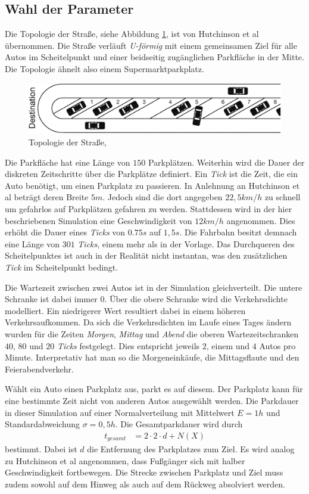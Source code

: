 \subsection{Wahl der Parameter}
Die Topologie der Straße, siehe Abbildung \ref{fig_street}, ist von Hutchinson et al übernommen. Die Straße verläuft \emph{U-förmig} mit einem gemeinsamen Ziel für alle Autos im Scheitelpunkt und einer beidseitig zugänglichen Parkfläche in der Mitte. Die Topologie ähnelt also einem Supermarktparkplatz. 
\begin{figure}
\includegraphics[width=\textwidth]{pics/street.png}
\caption{Topologie der Straße, \cite[Fig. 18-1]{hutchinson}}\label{fig_street}
\end{figure}
 Die Parkfläche hat eine Länge von $150$ Parkplätzen. Weiterhin wird die Dauer der diskreten Zeitschritte über die Parkplätze definiert. Ein \emph{Tick} ist die Zeit, die ein Auto benötigt, um einen Parkplatz zu passieren. 
In Anlehnung an Hutchinson et al \cite[Modeling the Interactions of Parking Strategies, S. 4f]{hutchinson} beträgt deren Breite $5m$. Jedoch sind die dort angegeben $22,5 km/h$ zu schnell um gefahrlos auf Parkplätzen gefahren zu werden. Stattdessen wird in der hier beschriebenen Simulation eine Geschwindigkeit von $12km/h$ angenommen. Dies erhöht die Dauer eines \emph{Ticks} von $0.75s$ auf $1,5s$. Die Fahrbahn besitzt demnach eine Länge von $301$ \emph{Ticks}, einem mehr als in der Vorlage. Das Durchqueren des Scheitelpunktes ist auch in der Realität nicht instantan, was den zusätzlichen \emph{Tick} im Scheitelpunkt bedingt. 

Die Wartezeit zwischen zwei Autos ist in der Simulation gleichverteilt. Die untere Schranke ist dabei immer $0$. Über die obere Schranke wird die Verkehrsdichte modelliert. Ein niedrigerer Wert resultiert dabei in einem höheren Verkehrsaufkommen. Da sich die Verkehrsdichten im Laufe eines Tages ändern wurden für die Zeiten \emph{Morgen}, \emph{Mittag} und \emph{Abend} die oberen Wartezeitschranken $40$, $80$ und $20$ \emph{Ticks} festgelegt. Dies entspricht jeweils $2$, einem und $4$ Autos pro Minute. Interpretativ hat man so die Morgeneinkäufe, die Mittagsflaute und den Feierabendverkehr. 

Wählt ein Auto einen Parkplatz aus, parkt es auf diesem. Der Parkplatz kann für eine bestimmte Zeit nicht von anderen Autos ausgewählt werden. Die Parkdauer in dieser Simulation auf einer Normalverteilung mit Mittelwert $E=1h$ und Standardabweichung $\sigma = 0,5h$. Die Gesamtparkdauer wird durch 
\begin{align}
t_{gesamt} &= 2\cdot 2\cdot d + N(X)
\end{align}
bestimmt. Dabei ist $d$ die Entfernung des Parkplatzes zum Ziel. Es wird analog zu Hutchinson et al angenommen, dass Fußgänger sich mit halber Geschwindigkeit fortbewegen. Die Strecke zwischen Parkplatz und Ziel muss zudem sowohl auf dem Hinweg als auch auf dem Rückweg absolviert werden.

